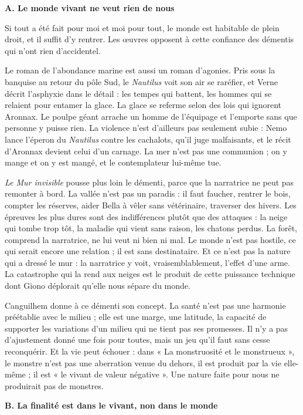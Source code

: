 \documentclass[11pt,a4paper]{article}
\begin{document}
\textbf{A. Le monde vivant ne veut rien de nous}

Si tout a été fait pour moi et moi pour tout, le monde est habitable de plein droit, et il suffit d'y rentrer. Les œuvres opposent à cette confiance des démentis qui n'ont rien d'accidentel.

Le roman de l'abondance marine est aussi un roman d'agonies. Pris sous la banquise au retour du pôle Sud, le \emph{Nautilus} voit son air se raréfier, et Verne décrit l'asphyxie dans le détail : les tempes qui battent, les hommes qui se relaient pour entamer la glace. La glace se referme selon des lois qui ignorent Aronnax. Le poulpe géant arrache un homme de l'équipage et l'emporte sans que personne y puisse rien. La violence n'est d'ailleurs pas seulement subie : Nemo lance l'éperon du \emph{Nautilus} contre les cachalots, qu'il juge malfaisants, et le récit d'Aronnax devient celui d'un carnage. La mer n'est pas une communion ; on y mange et on y est mangé, et le contemplateur lui-même tue.

\emph{Le Mur invisible} pousse plus loin le démenti, parce que la narratrice ne peut pas remonter à bord. La vallée n'est pas un paradis : il faut faucher, rentrer le bois, compter les réserves, aider Bella à vêler sans vétérinaire, traverser des hivers. Les épreuves les plus dures sont des indifférences plutôt que des attaques : la neige qui tombe trop tôt, la maladie qui vient sans raison, les chatons perdus. La forêt, comprend la narratrice, ne lui veut ni bien ni mal. Le monde n'est pas hostile, ce qui serait encore une relation ; il est sans destinataire. Et ce n'est pas la nature qui a dressé le mur : la narratrice y voit, vraisemblablement, l'effet d'une arme. La catastrophe qui la rend aux neiges est le produit de cette puissance technique dont Giono déplorait qu'elle nous sépare du monde.

Canguilhem donne à ce démenti son concept. La santé n'est pas une harmonie préétablie avec le milieu ; elle est une marge, une latitude, la capacité de supporter les variations d'un milieu qui ne tient pas ses promesses. Il n'y a pas d'ajustement donné une fois pour toutes, mais un jeu qu'il faut sans cesse reconquérir. Et la vie peut échouer : dans « La monstruosité et le monstrueux », le monstre n'est pas une aberration venue du dehors, il est produit par la vie elle-même ; il est « le vivant de valeur négative ». Une nature faite pour nous ne produirait pas de monstres.

\textbf{B. La finalité est dans le vivant, non dans le monde}
\end{document}
